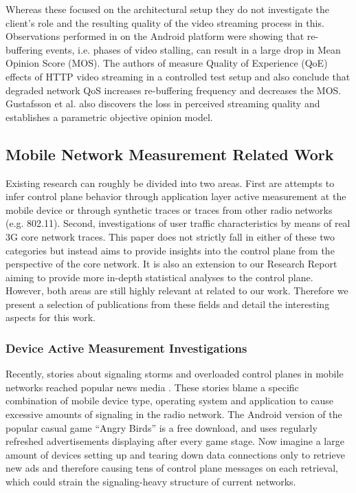 Whereas these focused on the architectural setup they do not investigate the client's role and the resulting quality of the video streaming process in this. 
Observations performed in \cite{ketyko2010qoe} on the Android platform were showing that re-buffering events, i.e. phases of video stalling, can result in a large drop in Mean Opinion Score (MOS). The authors of \cite{mokmeasuring} measure Quality of Experience (QoE) effects of HTTP video streaming in a controlled test setup and also conclude that degraded network QoS increases re-buffering frequency and decreases the MOS. Gustafsson et al. \cite{gustafsson2008measmmmquality} also discovers the loss in perceived streaming quality and establishes a parametric objective opinion model.


\subsection{Mobile Network Measurement Related Work}

Existing research can roughly be divided into two areas. First are attempts to infer control plane behavior through application layer active measurement at the mobile device or through synthetic traces or traces from other radio networks (e.g. 802.11).
Second, investigations of user traffic characteristics by means of real 3G core network traces.
This paper does not strictly fall in either of these two categories but instead aims to provide insights into the control plane from the perspective of the core network. It is also an extension to our Research Report\cite{metzger2012research} aiming to provide more in-depth statistical analyses to the control plane.  
However, both areas are still highly relevant at related to our work. Therefore we present a selection of publications from these fields and detail the interesting aspects for this work.

\subsubsection{Device Active Measurement Investigations}

Recently, stories about signaling storms and overloaded control planes in mobile networks reached popular news media \cite{it2011birdandroid, lt2012docostorm}. These stories blame a specific combination of mobile device type, operating system and application to cause excessive amounts of signaling in the radio network. The Android version of the popular casual game ``Angry Birds'' is a free download, and uses regularly refreshed advertisements displaying after every game stage. Now imagine a large amount of devices setting up and tearing down data connections only to retrieve new ads and therefore causing tens of control plane messages on each retrieval, which could strain the signaling-heavy structure of current networks. 

